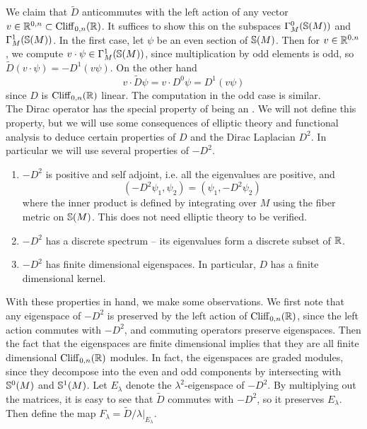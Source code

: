 We claim that $\widetilde{D}$ anticommutes with the left action of any vector
$v \in \R^{0,n} \subset \Cliff_{0,n}(\R)$. It suffices to show this on the
subspaces $\Gamma_M^0(\S(M))$ and $\Gamma_M^1(\S(M))$. In the first case,
let $\psi$ be an even section of $\S(M)$. Then for $v \in \R^{0,n}$, we compute
$v \cdot \psi \in \Gamma_M^1(\S(M))$, since multiplication by odd elements is odd,
so $\tilde{D}(v \cdot \psi) = -D^1(v\psi)$. On the other hand
\[
v \cdot \widetilde{D}\psi = v \cdot D^0\psi = D^1(v\psi)
\]
since $D$ is $\Cliff_{0,n}(\R)$ linear. The computation in the odd case is similar.\\
%

The Dirac operator has the special property of being an
. We will not define this property, but we will use some
consequences of elliptic theory and functional analysis to deduce
certain properties of $D$ and the Dirac Laplacian $D^2$. In particular we will use
several properties of $-D^2$.
\begin{enumerate}
  \item $-D^2$ is positive and self adjoint, i.e. all the eigenvalues are positive,
  and
  \[
  (-D^2\psi_1, \psi_2) = (\psi_1, -D^2\psi_2)
  \]
  where the inner product is defined
  by integrating over $M$ using the fiber metric on $\S(M)$. This does not need
  elliptic theory to be verified.
  \item $-D^2$ has a discrete spectrum -- its eigenvalues form a discrete subset
  of $\R$.
  \item $-D^2$ has finite dimensional eigenspaces. In particular, $D$ has a finite
  dimensional kernel.
\end{enumerate}
%
With these properties in hand, we make some observations. We first note that
any eigenspace of $-D^2$ is preserved by the left action of $\Cliff_{0,n}(\R)$, since
the left action commutes with $-D^2$, and commuting operators preserve eigenspaces.
Then the fact that the eigenspaces are finite dimensional implies that they are all
finite dimensional $\Cliff_{0,n}(\R)$ modules. In fact, the eigenspaces are graded
modules, since they decompose into the even and odd components by intersecting with
$\S^0(M)$ and $\S^1(M)$. Let $E_\lambda$ denote the $\lambda^2$-eigenspace of $-D^2$.
By multiplying out the  matrices, it is easy to see that $\tilde{D}$ commutes with
$-D^2$, so it preserves $E_\lambda$. Then define the map
$F_\lambda = \tilde{D}/\lambda\vert_{E_\lambda}$.
%
